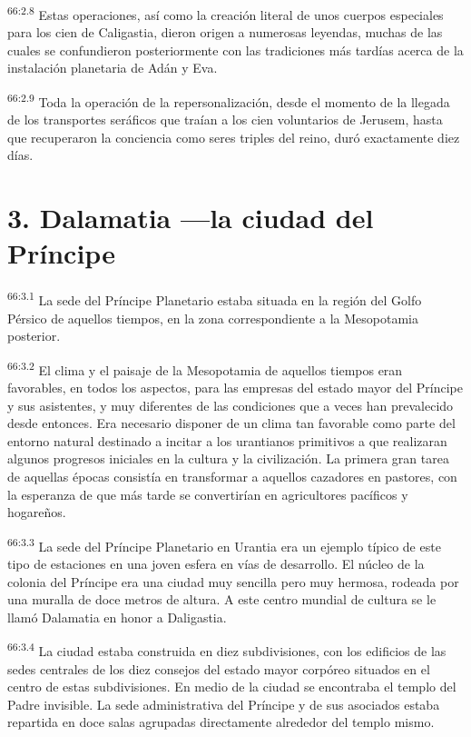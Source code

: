 \par
\textsuperscript{66:2.8} Estas operaciones, así como la creación literal de unos cuerpos especiales para los cien de Caligastia, dieron origen a numerosas leyendas, muchas de las cuales se confundieron posteriormente con las tradiciones más tardías acerca de la instalación planetaria de Adán y Eva.

\par
\textsuperscript{66:2.9} Toda la operación de la repersonalización, desde el momento de la llegada de los transportes seráficos que traían a los cien voluntarios de Jerusem, hasta que recuperaron la conciencia como seres triples del reino, duró exactamente diez días.

\section*{3. Dalamatia ---la ciudad del Príncipe}
\par
\textsuperscript{66:3.1} La sede del Príncipe Planetario estaba situada en la región del Golfo Pérsico de aquellos tiempos, en la zona correspondiente a la Mesopotamia posterior.

\par
\textsuperscript{66:3.2} El clima y el paisaje de la Mesopotamia de aquellos tiempos eran favorables, en todos los aspectos, para las empresas del estado mayor del Príncipe y sus asistentes, y muy diferentes de las condiciones que a veces han prevalecido desde entonces. Era necesario disponer de un clima tan favorable como parte del entorno natural destinado a incitar a los urantianos primitivos a que realizaran algunos progresos iniciales en la cultura y la civilización. La primera gran tarea de aquellas épocas consistía en transformar a aquellos cazadores en pastores, con la esperanza de que más tarde se convertirían en agricultores pacíficos y hogareños.

\par
\textsuperscript{66:3.3} La sede del Príncipe Planetario en Urantia era un ejemplo típico de este tipo de estaciones en una joven esfera en vías de desarrollo. El núcleo de la colonia del Príncipe era una ciudad muy sencilla pero muy hermosa, rodeada por una muralla de doce metros de altura. A este centro mundial de cultura se le llamó Dalamatia en honor a Daligastia.

\par
\textsuperscript{66:3.4} La ciudad estaba construida en diez subdivisiones, con los edificios de las sedes centrales de los diez consejos del estado mayor corpóreo situados en el centro de estas subdivisiones. En medio de la ciudad se encontraba el templo del Padre invisible. La sede administrativa del Príncipe y de sus asociados estaba repartida en doce salas agrupadas directamente alrededor del templo mismo.

